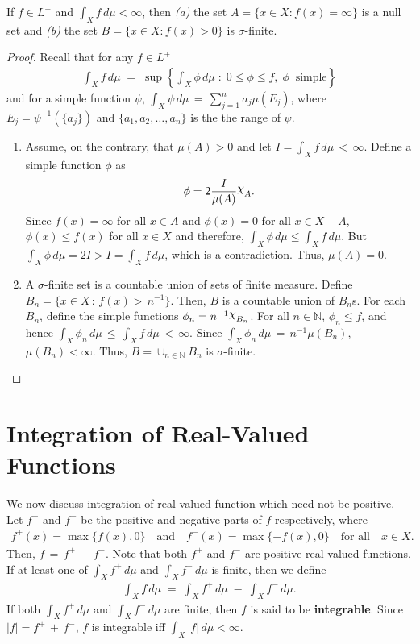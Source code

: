 \documentclass[a4paper,english,12pt]{article}
\newcommand{\goodchi}{\protect\raisebox{2.5pt}{$\chi$}}
\begin{document}
\begin{prop} If $f\in L^+$ and $\int_X f\,d\mu < \infty$, then \textit{(a)} the set $A=\{x\in X: f(x)=\infty\}$ is a null set and \textit{(b)} the set $B=\{x\in X:f(x)>0\}$ is $\sigma$-finite.
\label{int_nll_fnt}
\end{prop}
\begin{proof} Recall that for any $f\in L^+$
	\begin{align*}
		\int_X f\,d\mu \;=\; \sup \left\{\int_X \phi\,d\mu \; : \; 0\leqslant \phi \leqslant f,				\; \phi \;\;\text{simple}\right\}
	\end{align*}
and for a simple function $\psi$, $\int_X \psi\,d\mu\,=\,\sum _{j=1}^n a_j\mu(E_j)$, where $E_j=\psi^{-1}(\{a_j\})$ and $\{a_1,a_2,\ldots,a_n\}$ is the the range of $\psi$.
\begin{enumerate}[\itshape(a)]
\item Assume, on the contrary, that $\mu(A)>0$ and let $I=\int_X f\,d\mu\,<\,\infty$. Define a simple function $\phi$ as 
	\begin{align*}
		\phi = 2\frac{I}{\mu(A)} \goodchi _A.
	\end{align*}
Since $f(x)=\infty$ for all $x\in A$ and $\phi(x)=0$ for all $x\in X-A$, $\phi(x)\leqslant f(x)$ for all $x\in X$ and therefore, $\int_X \phi\,d\mu\leqslant \int_X f\,d\mu$. But $\int_X \phi\,d\mu=2I>I=\int_X f\,d\mu$, which is a contradiction. Thus, $\mu(A)=0$.
\item A $\sigma$-finite set is a countable union of sets of finite measure. Define $B_n=\{x\in X\,:\,f(x)>\,n^{-1}\}$. Then, $B$ is a countable union of $B_n$s. For each $B_n$, define the simple functions $\phi_n = n^{-1} \goodchi _{B_n}$. For all $n\in \mathbb{N}$, $\phi_n\leqslant f$, and hence $\int_X \phi_n\,d\mu \,\leqslant \, \int_X f\,d\mu\,<\,\infty$. Since $\int_X \phi_n\,d\mu\,=\,n^{-1}\mu(B_n)$, $\mu(B_n)<\infty$. Thus, $B=\cup _{n\in \mathbb{N}}B_n$ is $\sigma$-finite.
\end{enumerate}
\end{proof}

\section{Integration of Real-Valued Functions}
We now discuss integration of real-valued function which need not be positive. Let $f^+$ and $f^-$ be the positive and negative parts of $f$ respectively, where 
	\begin{align*}
		f^+(x)=\max\{f(x),0\} \quad\text{and}\quad f^-(x)=\max\{-f(x),0\} \quad\text{for all}\quad x\in X.
	\end{align*}
Then, $f\,=\,f^+\,-\,f^-$. Note that both $f^+$ and $f^-$ are positive real-valued functions. If at least one of $\int_X f^+\,d\mu$ and $\int_X f^-\,d\mu$ is finite, then we define
	\begin{align*}
		\int_X f\,d\mu \;=\; \int_X f^+\,d\mu \;-\; \int_X f^-\,d\mu.
	\end{align*}
If both $\int_X f^+\,d\mu$ and $\int_X f^-\,d\mu$ are finite, then $f$ is said to be \textbf{integrable}. Since $|f|=f^+\,+\,f^-$, $f$ is integrable iff $\int_X |f|\,d\mu<\infty$.
\end{document}
